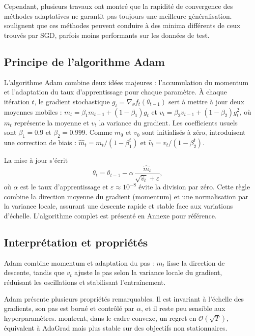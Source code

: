 \documentclass[a4paper,12pt]{article}
\begin{document}
Cependant, plusieurs travaux ont montré que la rapidité de convergence des méthodes
adaptatives ne garantit pas toujours une meilleure généralisation. \cite{wilson2017}
soulignent que ces méthodes peuvent conduire à des minima différents de ceux trouvés par
SGD, parfois moins performants sur les données de test.

\subsection{Principe de l’algorithme Adam}

L’algorithme Adam combine deux idées
majeures : l’accumulation du momentum et l’adaptation du taux
d’apprentissage pour chaque paramètre. À chaque itération $t$, le gradient stochastique
$g_t = \nabla_\theta f_t(\theta_{t-1})$ sert à mettre à jour deux
moyennes mobiles :
$m_t = \beta_1 m_{t-1} + (1-\beta_1) g_t$ et
$v_t = \beta_2 v_{t-1} + (1-\beta_2) g_t^2$,
où $m_t$ représente la moyenne et $v_t$ la variance du gradient. Les coefficients usuels sont
$\beta_1=0.9$ et $\beta_2=0.999$. Comme $m_0$ et $v_0$ sont initialisés
à zéro, \cite{kingma2014} introduisent une correction de biais :
$\hat{m}_t = m_t/(1-\beta_1^t)$ et
$\hat{v}_t = v_t/(1-\beta_2^t)$.

La mise à jour s’écrit
\[
\theta_t = \theta_{t-1} - \alpha\,\frac{\hat{m}_t}{\sqrt{\hat{v}_t}+\varepsilon},
\]
où $\alpha$ est le taux d’apprentissage et $\varepsilon\approx10^{-8}$ évite la division par zéro.
Cette règle combine la direction moyenne du gradient (momentum) et une
normalisation par la variance locale, assurant une descente rapide et
stable face aux variations d’échelle.
L’algorithme complet est présenté en Annexe pour référence.


\subsection{Interprétation et propriétés}

Adam combine momentum et adaptation du pas : $m_t$ lisse la direction de
descente, tandis que $v_t$ ajuste le pas selon la variance locale du
gradient, réduisant les oscillations et stabilisant l’entraînement.

Adam présente plusieurs propriétés remarquables. Il est invariant à
l’échelle des gradients, son pas est borné et contrôlé par $\alpha$, et
il reste peu sensible aux hyperparamètres. \cite{kingma2014} montrent, dans
le cadre convexe, un regret en $\mathcal{O}(\sqrt{T})$, équivalent à
AdaGrad mais plus stable sur des objectifs non stationnaires.
\end{document}
